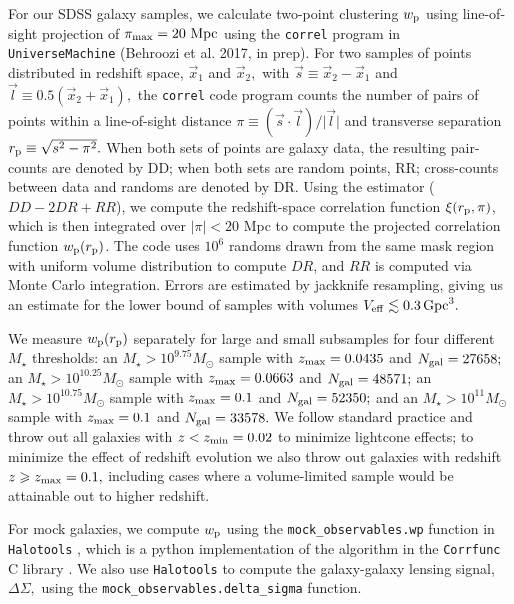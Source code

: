 \documentclass[usenatbib,usegraphicx,letterpaper]{mn2e}
\newcommand{\mstar}{M_{\star}}
\newcommand{\rproj}{r_{\rm p}}
\newcommand{\wproj}{w_{\rm p}}
\newcommand{\mpc}{{\rm Mpc}}
\newcommand{\msun}{M_\odot}
\begin{document}
For our SDSS galaxy samples, we calculate two-point clustering $\wproj$ using line-of-sight projection of $\pi_{\rm max}=20~\mpc$ using the {\tt correl} program in {\tt UniverseMachine} (Behroozi et al. 2017, in prep). For two samples of points distributed in redshift space, $\vec{x}_1$ and $\vec{x}_2,$ with $\vec{s}\equiv\vec{x}_2-\vec{x}_1$ and $\vec{l}\equiv0.5(\vec{x}_2+\vec{x}_1),$ the {\tt correl} code program counts the number of pairs of points within a line-of-sight distance $\pi\equiv(\vec{s}\cdot\vec{l})/\vert\vec{l}\vert$ and transverse separation $r_{\rm p}\equiv\sqrt{s^{2} - \pi^{2}}.$ When both sets of points are galaxy data, the resulting pair-counts are denoted by DD; when both sets are random points, RR; cross-counts between data and randoms are denoted by DR. Using the \citet{landy_szalay93} estimator ($DD - 2DR + RR$), we compute the redshift-space correlation function $\xi(\rproj, \pi)$, which is then integrated over $\vert\pi\vert < 20$ Mpc to compute the projected correlation function $\wproj(\rproj)$.  The code uses $10^6$ randoms drawn from the same mask region with uniform volume distribution to compute $DR$, and $RR$ is computed via Monte Carlo integration. Errors are estimated by jackknife resampling, giving us an estimate for the lower bound of samples with volumes $V_{\rm eff}\lesssim 0.3\,{\rm Gpc}^3.$

We measure $\wproj(\rproj)$ separately for large and small subsamples for four different $\mstar$ thresholds: an  $\mstar>10^{9.75}\msun$ sample with $z_{\rm max}=0.0435$ and $N_{\rm gal}=27658;$ an  $\mstar>10^{10.25}\msun$ sample with $z_{\rm max}=0.0663$ and $N_{\rm gal}=48571;$
an  $\mstar>10^{10.75}\msun$ sample with $z_{\rm max}=0.1$ and $N_{\rm gal}=52350;$
and an  $\mstar>10^{11}\msun$ sample with $z_{\rm max}=0.1$ and $N_{\rm gal}=33578.$ We follow standard practice \citep[e.g.,][]{zehavi_etal11} and throw out all galaxies with $z<z_{\rm min}=0.02$ to minimize lightcone effects; to minimize the effect of redshift evolution we also throw out galaxies with redshift $z \geq z_{\rm max}=0.1,$ including cases where a volume-limited sample would be attainable out to higher redshift.

For mock galaxies, we compute $\wproj$ using the {\tt mock\_observables.wp} function in {\tt Halotools} \citep{hearin_etal16}, which is a python implementation of the algorithm in the {\tt Corrfunc} C library \citep{sinha_etal17}. We also use {\tt Halotools} to compute the galaxy-galaxy lensing signal, $\Delta\Sigma,$ using the {\tt mock\_observables.delta\_sigma} function.
\end{document}
